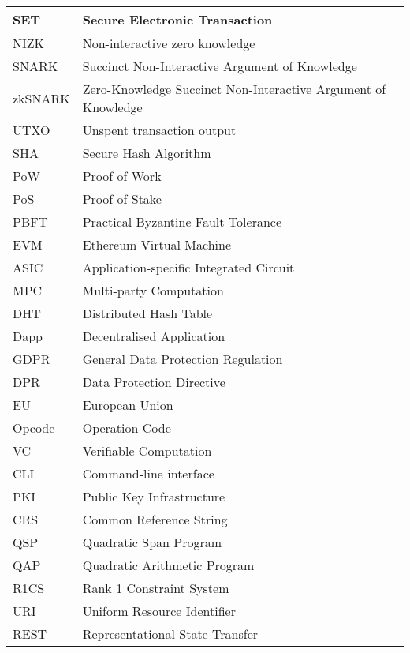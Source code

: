 
\abbreviations
\begin{center}
	\renewcommand{\arraystretch}{1.5}
	\begin{longtable}{ |l @{\qquad} |l| }
  \hline
	SET    & Secure Electronic Transaction \\ \hline
	NIZK & Non-interactive zero knowledge \\ \hline
	SNARK & Succinct Non-Interactive Argument of Knowledge \\ \hline
	zkSNARK    & Zero-Knowledge Succinct Non-Interactive Argument of Knowledge \\ \hline
	UTXO    & Unspent transaction output \\ \hline
	SHA    & Secure Hash Algorithm \\ \hline
	PoW    & Proof of Work \\ \hline
	PoS    & Proof of Stake \\ \hline
	PBFT    & Practical Byzantine Fault Tolerance \\ \hline
	EVM    & Ethereum Virtual Machine \\ \hline
	ASIC    & Application-specific Integrated Circuit \\ \hline
	MPC    & Multi-party Computation \\ \hline
	DHT    & Distributed Hash Table \\ \hline
	Dapp    & Decentralised Application \\ \hline
	GDPR    & General Data Protection Regulation \\ \hline
	DPR    & Data Protection Directive \\ \hline
	EU    & European Union \\ \hline
	Opcode    & Operation Code \\ \hline
	VC    & Verifiable Computation \\ \hline
	CLI    & Command-line interface \\ \hline
	PKI    & Public Key Infrastructure \\ \hline
	CRS    & Common Reference String \\ \hline
	QSP    & Quadratic Span Program \\ \hline
	QAP    & Quadratic Arithmetic Program \\ \hline
	R1CS    & Rank 1 Constraint System \\ \hline
	URI    & Uniform Resource Identifier \\ \hline
	REST    & Representational State Transfer \\ \hline

\end{longtable}
\end{center}
